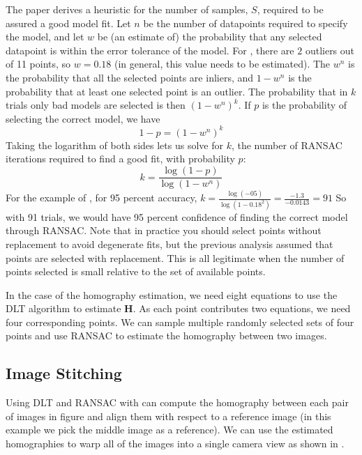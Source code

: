 The paper \cite{Fischler1981} derives a heuristic for the number of samples, $S$, required to be assured a good model fit.  Let $n$ be the number of datapoints required to specify the model, and let $w$ be (an estimate of) the probability that any selected datapoint is within the error tolerance of the model.   For , there are $2$ outliers out of 11 points, so $w = 0.18$ (in general, this value needs to be estimated).  The $w^n$ is the probability that all the selected points are inliers, and $1 -  w^n$ is the probability that at least one selected point is an outlier.  The probability that in $k$ trials only bad models are selected is then $(1 -  w^n)^k$.  If $p$ is the probability of selecting the correct model, we have %
\begin{equation}
    1-p = (1 -  w^n)^k
\end{equation}
Taking the logarithm of both sides lets us solve for $k$, the number of RANSAC iterations required to find a good fit, with probability $p$:
\begin{equation}
        k = \frac{\log(1-p)}{\log(1-w^n)}
        \label{eq:k}
\end{equation}
For the example of \fig{\ref{fig:ransac}}, for 95 percent accuracy, $k = \frac{\log(-05)}{\log(1-0.18^2)} = \frac{-1.3}{-0.0143} = 91$
So with 91 trials, we would have 95 percent confidence of finding the correct model through RANSAC. Note that in practice you should select points without replacement to avoid degenerate fits, but the previous analysis assumed that points are selected with replacement.  This is all legitimate when the number of points selected is small relative to the set of available points.

In the case of the homography estimation, we need eight equations to use the DLT algorithm to estimate $\mathbf{H}$. As each point contributes two equations, we need four corresponding points. We can sample multiple randomly selected sets of four points and use RANSAC to estimate the homography between two images. 

\subsection{Image Stitching}

Using DLT and RANSAC with can compute the homography between each pair of images in figure and align them with respect to a reference image (in this example we pick the middle image as a reference). We can use the estimated homographies to warp all of the images into a single camera view as shown in \fig{\ref{fig:panorama}}.

